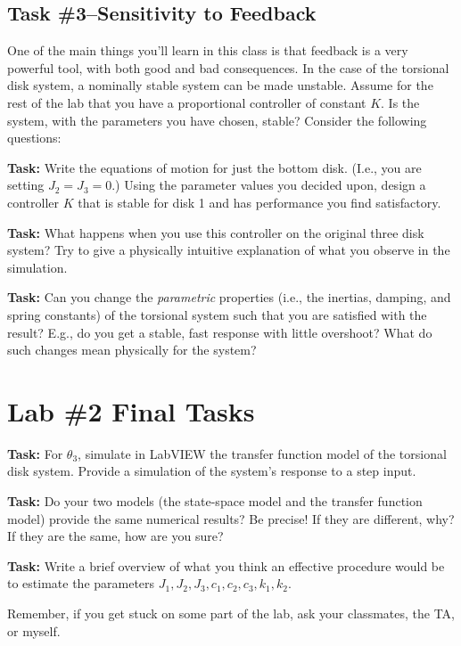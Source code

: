\subsection{Task \#3--Sensitivity to Feedback}

One of the main things you'll learn in this class is that feedback is a very
powerful tool, with both good and bad consequences.  In the case of the
torsional disk system, a nominally stable system can be made unstable.  Assume
for the rest of the lab that you have a proportional controller of constant $K$.
Is the system, with the parameters you have chosen, stable?  Consider the
following questions:

\noindent \textbf{Task:} Write the equations of motion for just the bottom
disk.  (I.e., you are setting $J_2=J_3=0$.)  Using the parameter values you
decided upon, design a controller $K$ that is stable for disk 1 and has
performance you find satisfactory.

\noindent \textbf{Task:} What happens when you use this controller on the
original three disk system?  Try to give a physically intuitive explanation of
what you observe in the simulation.

\noindent \textbf{Task:} Can you change the \emph{parametric} properties 
(i.e., the inertias, damping, and spring constants) of the torsional system such
that you are satisfied with the result?  E.g., do you get a stable, fast
response with little overshoot?  What do such changes mean physically for the
system?

\section{Lab \#2 Final Tasks}

\noindent \textbf{Task:}  For $\theta_3$, simulate in LabVIEW the transfer 
function model of the torsional disk system.  Provide a simulation of the
system's response to a step input.

\noindent \textbf{Task:}  Do your two models (the state-space model and the
transfer function model) provide the same numerical results?  Be precise!  If
they are different, why?  If they are the same, how are you sure?

\noindent \textbf{Task:}  Write a brief overview of what you think an effective
procedure would be to estimate the parameters
$J_1,J_2,J_3,c_1,c_2,c_3,k_1,k_2$.  


\noindent Remember, if you get stuck on some part of the lab, ask your
classmates, the TA, or myself.


